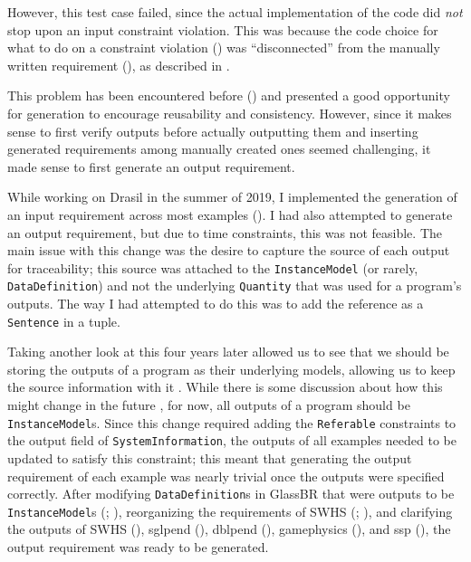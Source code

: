 However, this test case failed,
since the actual implementation of the code did \emph{not} stop upon an input
constraint violation. This was because the code choice for what to do on a
constraint violation () was ``disconnected'' from the
manually written requirement (), as described in
. 

This problem has been encountered before () and presented a good
opportunity for generation to encourage reusability and consistency. However,
since it makes sense to first verify outputs before actually outputting them
and inserting generated requirements among manually created ones seemed
challenging, it made sense to first generate an output requirement.

While working on Drasil in the summer of 2019, I implemented the generation
of an input requirement across most examples ().
I had also attempted to generate an output requirement, but due to time
constraints, this was not feasible. The
main issue with this change was the desire to capture the source of each output
for traceability; this source was attached to the \texttt{InstanceModel}
(or rarely, \texttt{DataDefinition}) and not the underlying \texttt{Quantity}
that was used for a program's outputs. The way I had attempted to do this was
to add the reference as a \texttt{Sentence} in a tuple.

Taking another look at this four years later allowed us to
see that we should be storing the outputs of a program as their underlying
models, allowing us to keep the source information with it
. While there is some discussion about how this might
change in the future , for now, all outputs of a program should be
\texttt{InstanceModel}s. Since this change required adding the
\texttt{Referable}  constraints to the output field of
\texttt{SystemInformation}, the outputs of all examples needed to be updated to
satisfy this constraint; this meant that generating the output requirement of
each example was nearly trivial once the outputs were specified correctly.
After modifying \texttt{DataDefinition}s in GlassBR that were outputs to be
\texttt{InstanceModel}s (; ), reorganizing the
requirements of SWHS (; ), and clarifying the
outputs of SWHS (), \acs{sglpend} (),
\acs{dblpend} (), \acs{gamephysics} (), and
\acs{ssp} (), the output requirement was ready to be generated.
